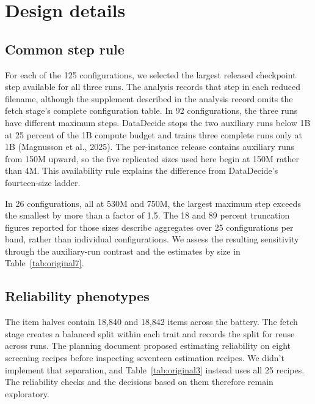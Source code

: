 \section{Design details}
\label{app:design}

\subsection{Common step rule}
For each of the 125 configurations, we selected the largest released checkpoint step available for all three runs. The analysis records that step in each reduced filename, although the supplement described in the analysis record omits the fetch stage's complete configuration table. In 92 configurations, the three runs have different maximum steps. DataDecide stops the two auxiliary runs below 1B at 25 percent of the 1B compute budget and trains three complete runs only at 1B (Magnusson et al., 2025). The per-instance release contains auxiliary runs from 150M upward, so the five replicated sizes used here begin at 150M rather than 4M. This availability rule explains the difference from DataDecide's fourteen-size ladder.

In 26 configurations, all at 530M and 750M, the largest maximum step exceeds the smallest by more than a factor of 1.5. The 18 and 89 percent truncation figures reported for those sizes describe aggregates over 25 configurations per band, rather than individual configurations. We assess the resulting sensitivity through the auxiliary-run contrast and the estimates by size in Table~\ref{tab:original7}.

\subsection{Reliability phenotypes}
The item halves contain 18,840 and 18,842 items across the battery. The fetch stage creates a balanced split within each trait and records the split for reuse across runs. The planning document proposed estimating reliability on eight screening recipes before inspecting seventeen estimation recipes. We didn't implement that separation, and Table~\ref{tab:original3} instead uses all 25 recipes. The reliability checks and the decisions based on them therefore remain exploratory.

